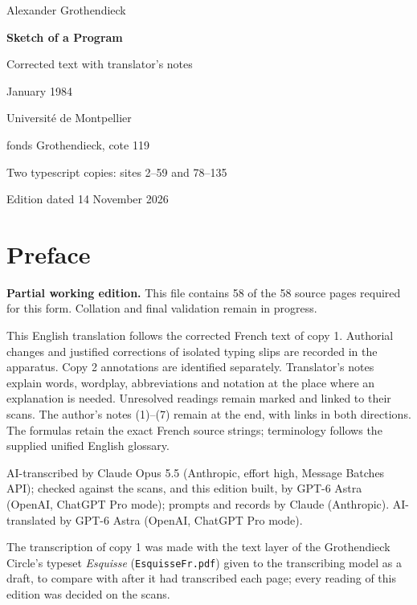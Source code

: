 \documentclass[11pt,a4paper]{article}
\newcommand{\EditionTitle}{Sketch of a Program}
\newcommand{\EditionForm}{Corrected text with translator’s notes}
\begin{document}
\begin{titlepage}
\centering
\vspace*{18mm}
{\Large Alexander Grothendieck\par}
\vspace{12mm}
{\Huge\bfseries\EditionTitle\par}
\vspace{8mm}
{\Large\EditionForm\par}
\vspace{14mm}
{\large January 1984\par}
\vfill
{\large Université de Montpellier\par fonds Grothendieck, cote 119\par}
\vspace{8mm}
{\normalsize Two typescript copies: sites 2--59 and 78--135\par}
\vspace{8mm}
{\normalsize Edition dated 14 November 2026\par}
\end{titlepage}
\thispagestyle{plain}
\section*{Preface}
\noindent\textbf{Partial working edition.} This file contains 58 of the 58 source pages required for this form. Collation and final validation remain in progress.\par\smallskip
This English translation follows the corrected French text of copy 1. Authorial changes and justified corrections of isolated typing slips are recorded in the apparatus. Copy 2 annotations are identified separately. Translator’s notes explain words, wordplay, abbreviations and notation at the place where an explanation is needed. Unresolved readings remain marked and linked to their scans. The author’s notes (1)–(7) remain at the end, with links in both directions. The formulas retain the exact French source strings; terminology follows the supplied unified English glossary.

\smallskip
AI-transcribed by Claude Opus 5.5 (Anthropic, effort high, Message Batches API); checked against the scans, and this edition built, by GPT-6 Astra (OpenAI, ChatGPT Pro mode); prompts and records by Claude (Anthropic).
AI-translated by GPT-6 Astra (OpenAI, ChatGPT Pro mode).

The transcription of copy 1 was made with the text layer of the Grothendieck Circle's typeset \textit{Esquisse} (\texttt{EsquisseFr.pdf}) given to the transcribing model as a draft, to compare with after it had transcribed each page; every reading of this edition was decided on the scans.
\end{document}
